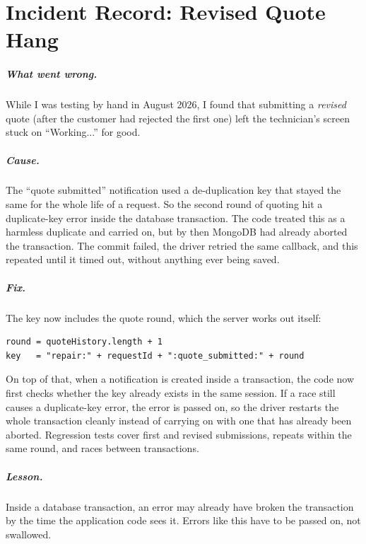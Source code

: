 \documentclass{standalone}
\begin{document}
\chapter{Incident Record: Revised Quote Hang}
\label{app:incident}
\paragraph*{What went wrong.} While I was testing by hand in August 2026, I found that submitting a \emph{revised} quote (after the customer had rejected the first one) left the technician's screen stuck on ``Working...'' for good.

\paragraph*{Cause.} The ``quote submitted'' notification used a de-duplication key that stayed the same for the whole life of a request. So the second round of quoting hit a duplicate-key error inside the database transaction. The code treated this as a harmless duplicate and carried on, but by then MongoDB had already aborted the transaction. The commit failed, the driver retried the same callback, and this repeated until it timed out, without anything ever being saved.

\paragraph*{Fix.} The key now includes the quote round, which the server works out itself:
\begin{lstlisting}[caption={Round-aware quote notification key},label={lst:roundkey}]
round = quoteHistory.length + 1
key   = "repair:" + requestId + ":quote_submitted:" + round
\end{lstlisting}
On top of that, when a notification is created inside a transaction, the code now first checks whether the key already exists in the same session. If a race still causes a duplicate-key error, the error is passed on, so the driver restarts the whole transaction cleanly instead of carrying on with one that has already been aborted. Regression tests cover first and revised submissions, repeats within the same round, and races between transactions.

\paragraph*{Lesson.} Inside a database transaction, an error may already have broken the transaction by the time the application code sees it. Errors like this have to be passed on, not swallowed.
\end{document}
